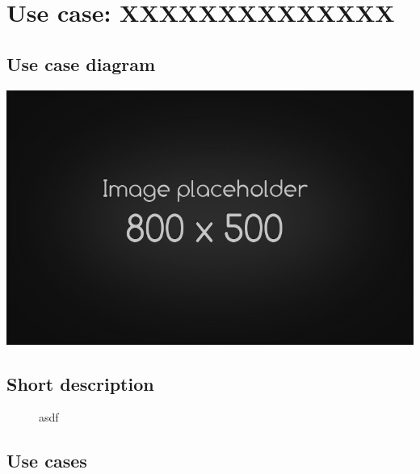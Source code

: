 \documentclass{article}
\begin{document}
\section{Use case: XXXXXXXXXXXXXX}
	\subsection{Use case diagram}
\includegraphics[width=\textwidth]{placeholder}
	\subsection{Short description}
	\begin{description}
		\item[] asdf
	\end{description}
	\subsection{Use cases}
\end{document}
